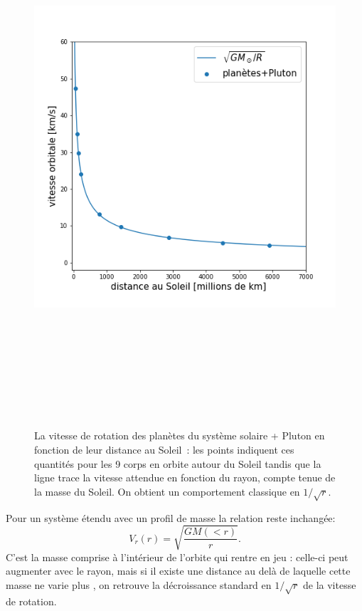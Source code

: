 \begin{figure}[htbp]
	\centering
		\includegraphics[height=20cm]{figs/sysol.png}
	\caption[La vitesse de rotation des planètes du système solaire]{La vitesse de rotation des planètes du système solaire + Pluton en fonction de leur distance au Soleil~: les points indiquent ces quantités pour les 9 corps en orbite autour du Soleil tandis que la ligne trace la vitesse attendue en fonction du rayon, compte tenue de la masse du Soleil. On obtient un comportement classique en $1/\sqrt{r}$.} 
	\label{f:sysol}
\end{figure}


Pour un système étendu avec un profil de masse la relation reste inchangée:
\begin{equation}
V_r(r)=\sqrt{\frac{GM(<r)}{r}}.
\end{equation}
C'est la masse comprise à l'intérieur de l'orbite qui rentre en jeu : celle-ci peut augmenter avec le rayon, mais si il existe une distance au delà de laquelle cette masse ne varie plus , on retrouve la décroissance standard en $1/\sqrt{r}$ de la vitesse de rotation.


